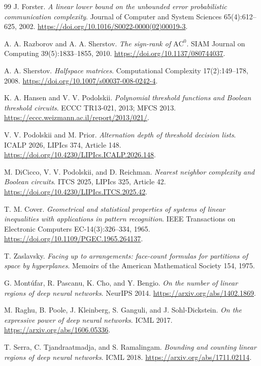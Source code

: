 \documentclass[11pt]{article}
\theoremstyle{definition}
\begin{document}
\begin{thebibliography}{99}
J. Forster.
\emph{A linear lower bound on the unbounded error probabilistic communication complexity}.
Journal of Computer and System Sciences 65(4):612--625, 2002.
\url{https://doi.org/10.1016/S0022-0000(02)00019-3}.

A. A. Razborov and A. A. Sherstov.
\emph{The sign-rank of \(\mathrm{AC}^0\)}.
SIAM Journal on Computing 39(5):1833--1855, 2010.
\url{https://doi.org/10.1137/080744037}.

A. A. Sherstov.
\emph{Halfspace matrices}.
Computational Complexity 17(2):149--178, 2008.
\url{https://doi.org/10.1007/s00037-008-0242-4}.

K. A. Hansen and V. V. Podolskii.
\emph{Polynomial threshold functions and Boolean threshold circuits}.
ECCC TR13-021, 2013; MFCS 2013.
\url{https://eccc.weizmann.ac.il/report/2013/021/}.

V. V. Podolskii and M. Prior.
\emph{Alternation depth of threshold decision lists}.
ICALP 2026, LIPIcs 374, Article 148.
\url{https://doi.org/10.4230/LIPIcs.ICALP.2026.148}.

M. DiCicco, V. V. Podolskii, and D. Reichman.
\emph{Nearest neighbor complexity and Boolean circuits}.
ITCS 2025, LIPIcs 325, Article 42.
\url{https://doi.org/10.4230/LIPIcs.ITCS.2025.42}.

T. M. Cover.
\emph{Geometrical and statistical properties of systems of linear inequalities with applications in pattern recognition}.
IEEE Transactions on Electronic Computers EC-14(3):326--334, 1965.
\url{https://doi.org/10.1109/PGEC.1965.264137}.

T. Zaslavsky.
\emph{Facing up to arrangements: face-count formulas for partitions of space by hyperplanes}.
Memoirs of the American Mathematical Society 154, 1975.

G. Mont\'ufar, R. Pascanu, K. Cho, and Y. Bengio.
\emph{On the number of linear regions of deep neural networks}.
NeurIPS 2014.
\url{https://arxiv.org/abs/1402.1869}.

M. Raghu, B. Poole, J. Kleinberg, S. Ganguli, and J. Sohl-Dickstein.
\emph{On the expressive power of deep neural networks}.
ICML 2017.
\url{https://arxiv.org/abs/1606.05336}.

T. Serra, C. Tjandraatmadja, and S. Ramalingam.
\emph{Bounding and counting linear regions of deep neural networks}.
ICML 2018.
\url{https://arxiv.org/abs/1711.02114}.


\end{thebibliography}
\end{document}

